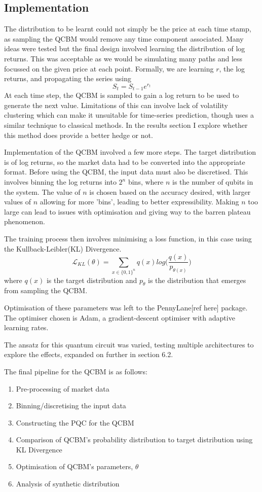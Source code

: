 \documentclass[12pt]{article}
\newcommand{\newp}
    {
    \vskip 0.5cm 
  }
\numberwithin{equation}{section}
\begin{document}
\subsection{Implementation}
The distribution to be learnt could not simply be the price at each time stamp, 
as sampling the QCBM would remove any time component associated. Many ideas were tested 
but the final design involved learning the distribution of log returns. This was 
acceptable as we would be simulating many paths and less focussed on the given 
price at each point. Formally, we are learning $r$, the log returns, and propagating 
the series using 
\begin{equation}
  S_t = S_{t-1}e^{r_t}
\end{equation}
At each time step, the QCBM is sampled to gain a log return to be used to generate 
the next value. Limitations of this can involve lack of volatility clustering which 
can make it unsuitable for time-series prediction, though uses a similar technique 
to classical methods. In the results section I explore whether this method does 
provide a better hedge or not.
\newp
Implementation of the QCBM involved a few more steps. The target distribution 
is of log returns, so the market data had to be converted into the appropriate 
format. Before using the QCBM, the input data must also be discretised. This 
involves binning the log returns into $2^n$ bins, where $n$ is the number of 
qubits in the system. The value of $n$ is chosen based on the accuracy desired, 
with larger values of $n$ allowing for more 'bins', leading to better expressibility.
Making $n$ too large can lead to issues with optimisation and giving way to the 
barren plateau phenomenon.
\newp
The training process then involves minimising a loss function, in this case using 
the Kullback-Leibler(KL) Divergence. 
\begin{equation}
\mathcal{L}_{KL}(\theta) = \sum_{x \in \{0,1\}^n}q(x)log\bigl( \frac{q(x)}{p_{\theta(x)}}\bigr)
\end{equation}
where $q(x)$ is the target distribution and $p_{\theta}$ is the distribution that 
emerges from sampling the QCBM.
\newp
Optimisation of these parameters was left to the PennyLane[ref here] package. 
The optimiser chosen is Adam, a gradient-descent optimiser with adaptive 
learning rates.
\newp
The ansatz for this quantum circuit was varied, testing multiple architectures
to explore the effects, expanded on further in section 6.2.
\newp
The final pipeline for the QCBM is as follows:
\begin{enumerate}
  \item Pre-processing of market data
  \item Binning/discretising the input data
  \item Constructing the PQC for the QCBM
  \item Comparison of QCBM's probability distribution to target distribution using
  KL Divergence
  \item Optimisation of QCBM's parameters, $\theta$
  \item Analysis of synthetic distribution
\end{enumerate}
\end{document}
